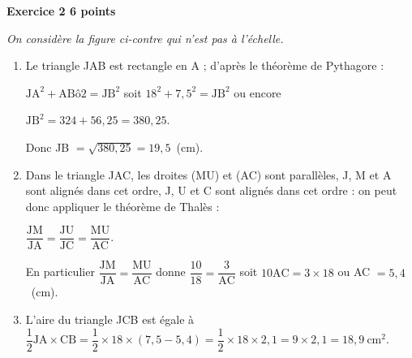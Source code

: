 \textbf{Exercice 2 \hfill 6 points}

\medskip

\emph{On considère la figure ci-contre qui n'est pas à l'échelle.}

\medskip


\begin{enumerate}
\item %
Le triangle JAB est rectangle en A ; d'après le théorème de Pythagore :

$\text{JA}^2 + \text{AB}ô2 = \text{JB}^2$ soit $18^2 + 7,5^2 =  \text{JB}^2$ ou encore 

$\text{JB}^2 = 324 + 56,25 = 380,25$.

Donc JB $ = \sqrt{380,25} = 19,5$~(cm).
\item %
Dans le triangle JAC, les droites (MU) et (AC) sont parallèles, J, M et A sont alignés dans cet ordre, J, U et C  sont alignés dans cet ordre : on peut donc appliquer le théorème de Thalès :

$\dfrac{\text{JM}}{\text{JA}} = \dfrac{\text{JU}}{\text{JC}} = \dfrac{\text{MU}}{\text{AC}}$.

En particulier $\dfrac{\text{JM}}{\text{JA}} =  \dfrac{\text{MU}}{\text{AC}}$ donne $\dfrac{10}{18} = \dfrac{3}{\text{AC}}$ soit $10\text{AC} = 3 \times 18$ ou AC $ = 5,4$~(cm).
\item %
L'aire  du triangle JCB est égale à $\dfrac{1}{2} \text{JA} \times \text{CB} = \dfrac{1}{2} \times 18 \times (7,5 - 5,4)  = \dfrac{1}{2} \times 18 \times 2,1  = 9 \times 2,1 = 18,9~\text{cm}^2$.
\end{enumerate}

\vspace{0.5cm}

